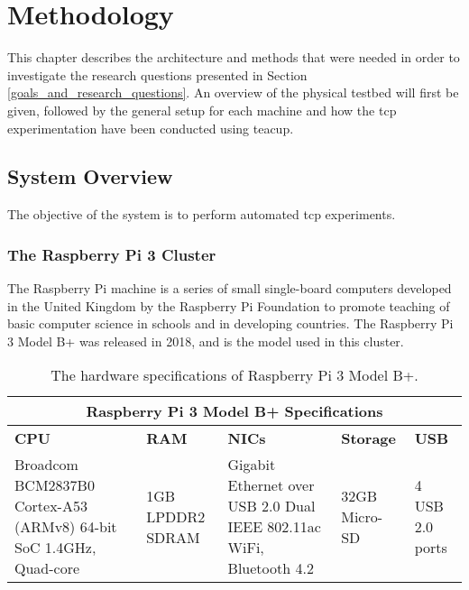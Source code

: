 \chapter{Methodology}

This chapter describes the architecture and methods that were needed in order to investigate the research questions presented in Section \ref{goals_and_research_questions}. An overview of the physical testbed will first be given, followed by the general setup for each machine and how the \gls{tcp} experimentation have been conducted using \gls{teacup}. 



\section{System Overview}

The objective of the system is to perform automated \gls{tcp} experiments. 




\subsection{The Raspberry Pi 3 Cluster}

The Raspberry Pi machine is a series of small single-board computers developed in the United Kingdom by the Raspberry Pi Foundation to promote teaching of basic computer science in schools and in developing countries. The Raspberry Pi 3 Model B+ was released in 2018, and is the model used in this cluster.

\begin{table}[H]
    \centering
    \begin{tabular}{ |p{4cm}|p{2cm}|p{4cm}|p{2cm}|p{2cm}|  }
        \hline
        \multicolumn{5}{|c|}{\textbf{Raspberry Pi 3 Model B+ Specifications}} \\
        \hline
        \textbf{CPU} & \textbf{RAM} & \textbf{NICs} & \textbf{Storage} & \textbf{USB}\\
        \hline
        Broadcom BCM2837B0 \newline Cortex-A53 (ARMv8) 64-bit SoC \newline 1.4GHz, Quad-core &
        1GB LPDDR2 SDRAM &
        Gigabit Ethernet over USB 2.0 \newline Dual IEEE 802.11ac WiFi, Bluetooth 4.2 &
        32GB Micro-SD &
        4 USB 2.0 ports\\
        \hline
    \end{tabular}
    \caption{The hardware specifications of Raspberry Pi 3 Model B+.}
\end{table}

